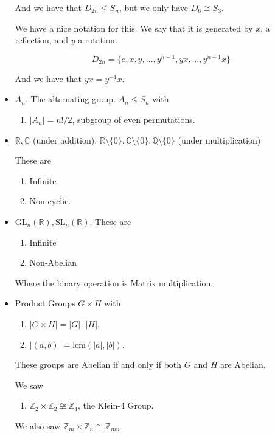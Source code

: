 \documentclass[12pt]{article}
\def\lcm{\text{lcm}}
\def\gl{\text{GL}}
\def\sl{\text{SL}}
\def\Z{{\mathbb Z}}
\def\Q{{\mathbb Q}}
\def\R{{\mathbb R}}
\def\C{{\mathbb C}}
\theoremstyle{remark}
\theoremstyle{remark}
\theoremstyle{remark}
\theoremstyle{remark}
\theoremstyle{remark}
\begin{document}
\begin{itemize}
    And we have that $D_{2n} \le S_n$, but we only have $D_6 \cong S_3$.

    We have a nice notation for this. We say that it is generated by $x$, a
    reflection, and $y$ a rotation.

    \[
      D_{2n} = \{e, x, y, \dots, y^{n - 1}, yx, \dots, y^{n-1}x\}
    \]

    And we have that $yx = y^{-1}x$.

  \item $A_n$. The alternating group. $A_n \le S_n$ with

    \begin{enumerate}
      \item $|A_n| = n! / 2$, subgroup of even permutations.
    \end{enumerate}

  \item $\R, \C$ (under addition), $\R \setminus \{0\}, \C \setminus \{0\}, \Q
    \setminus \{0\}$ (under multiplication)

    These are

    \begin{enumerate}
      \item Infinite
      \item Non-cyclic.
    \end{enumerate}

  \item $\gl_n(\R), \sl_n(\R)$. These are

    \begin{enumerate}
      \item Infinite
      \item Non-Abelian
    \end{enumerate}

    Where the binary operation is Matrix multiplication.

  \item Product Groups $G \times H$ with

    \begin{enumerate}
      \item $|G \times H| = |G| \cdot |H|$.
      \item $|(a, b)| = \lcm(|a|, |b|)$.
    \end{enumerate}

    These groups are Abelian if and only if both $G$ and $H$ are Abelian.

    We saw

    \begin{enumerate}
      \item $\Z_2 \times \Z_2 \not\cong \Z_4$, the Klein-4 Group.
    \end{enumerate}

    We also saw $\Z_m \times \Z_n \cong \Z_{mn}$
\end{itemize}
\end{document}
